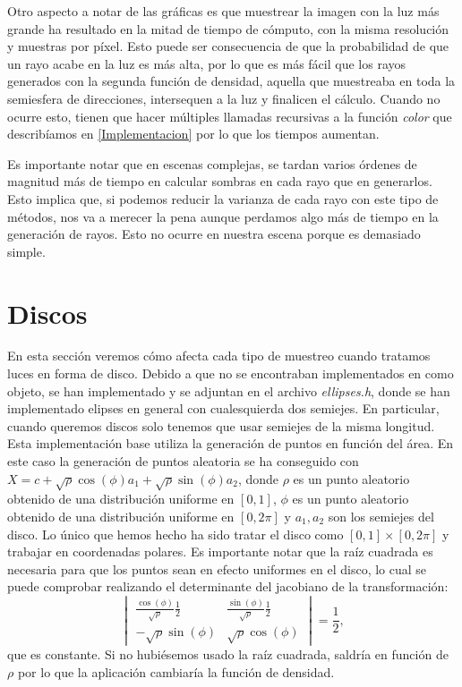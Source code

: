 \documentclass{scrbook}
\begin{document}
Otro aspecto a notar de las gráficas es que muestrear la imagen con la luz más grande ha resultado en la mitad de tiempo de cómputo, con la misma resolución y muestras por píxel. Esto puede ser consecuencia de que la probabilidad de que un rayo acabe en la luz es más alta, por lo que es más fácil que los rayos generados con la segunda función de densidad, aquella que muestreaba en toda la semiesfera de direcciones, intersequen a la luz y finalicen el cálculo. Cuando no ocurre esto, tienen que hacer múltiples llamadas recursivas a la función \textit{color} que describíamos en \ref{Implementacion} por lo que los tiempos aumentan. 

Es importante notar que en escenas complejas, se tardan varios órdenes de magnitud más de tiempo en calcular sombras en cada rayo que en generarlos. Esto implica que, si podemos reducir la varianza de cada rayo con este tipo de métodos, nos va a merecer la pena aunque perdamos algo más de tiempo en la generación de rayos. Esto no ocurre en nuestra escena porque es demasiado simple.

\section{Discos}
\label{discos}
En esta sección veremos cómo afecta cada tipo de muestreo cuando tratamos luces en forma de disco. Debido a que no se encontraban implementados en \cite{RestOfYourLife} como objeto, se han implementado y se adjuntan en el archivo \textit{ellipses.h}, donde se han implementado elipses en general con cualesquierda dos semiejes. En particular, cuando queremos discos solo tenemos que usar semiejes de la misma longitud. Esta implementación base utiliza la generación de puntos en función del área. En este caso la generación de puntos aleatoria se ha conseguido con $X = c + \sqrt{\rho}\cos(\phi)a_1 + \sqrt{\rho}\sin(\phi)a_2$, donde $\rho$ es un punto aleatorio obtenido de una distribución uniforme en $[0,1]$, $\phi$ es un punto aleatorio obtenido de una distribución uniforme en $[0, 2\pi]$ y $a_1, a_2$ son los semiejes del disco. Lo único que hemos hecho ha sido tratar el disco como $[0,1]\times[0,2\pi]$ y trabajar en coordenadas polares. Es importante notar que la raíz cuadrada es necesaria para que los puntos sean en efecto uniformes en el disco, lo cual se puede comprobar realizando el determinante del jacobiano de la transformación:
$$\begin{vmatrix}
\frac{\cos(\phi)}{\sqrt{\rho}} \frac{1}{2} & \frac{\sin(\phi)}{ \sqrt{\rho}}\frac{1}{2} \\
-\sqrt{\rho}\sin(\phi) & \sqrt{\rho}\cos(\phi)
\end{vmatrix} = \frac{1}{2},$$
que es constante. Si no hubiésemos usado la raíz cuadrada, saldría en función de $\rho$ por lo que la aplicación cambiaría la función de densidad.
\end{document}
